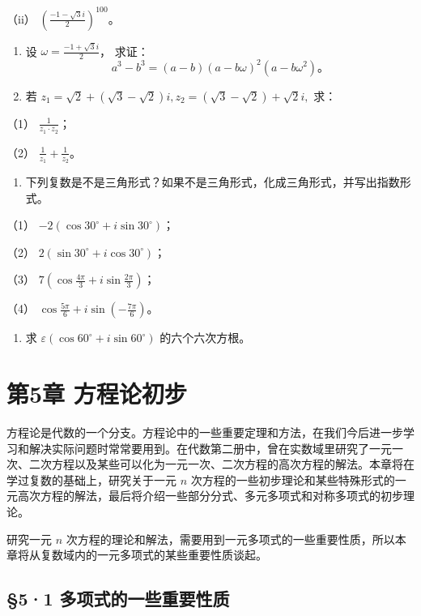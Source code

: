 （ii） \(\left(\frac{-1 - \sqrt{3}i}{2}\right)^{100}\)。

\begin{enumerate}[start=5]
\item
  设 \(\omega = \frac{-1 + \sqrt{3}i}{2}\)， 求证：
\[
a ^ {3} - b ^ {3} = (a - b) (a - b \omega) ^ {2} (a - b \omega^ {2})\text{。}
\]
\item
  若
  \(z_{1} = \sqrt{2} + (\sqrt{3} - \sqrt{2})i, z_{2} = (\sqrt{3} - \sqrt{2}) + \sqrt{2}i,\)
  求：
\end{enumerate}

（1） \(\frac{1}{z_1 \cdot z_2}\)；

（2） \(\frac{1}{z_1} + \frac{1}{z_2}\)。

\begin{enumerate}[start=7]
\item
  下列复数是不是三角形式？如果不是三角形式，化成三角形式，并写出指数形式。
\end{enumerate}

（1） \(-2(\cos 30^{\circ} + i\sin 30^{\circ})\)；

（2） \(2(\sin 30^{\circ} + i\cos 30^{\circ})\)；

（3） \(7\left(\cos \frac{4\pi}{3} + i\sin \frac{2\pi}{3}\right)\)；

（4） \(\cos \frac{5\pi}{6} + i\sin \left(-\frac{7\pi}{6}\right)\)。

\begin{enumerate}[start=8]
\item
  求 \(\varepsilon (\cos 60^{\circ} + i\sin 60^{\circ})\)
  的六个六次方根。
\end{enumerate}

\chapter{第5章 方程论初步}

方程论是代数的一个分支。方程论中的一些重要定理和方法，在我们今后进一步学习和解决实际问题时常常要用到。在代数第二册中，曾在实数域里研究了一元一次、二次方程以及某些可以化为一元一次、二次方程的高次方程的解法。本章将在学过复数的基础上，研究关于一元
\(n\)
次方程的一些初步理论和某些特殊形式的一元高次方程的解法，最后将介绍一些部分分式、多元多项式和对称多项式的初步理论。

研究一元 \(n\)
次方程的理论和解法，需要用到一元多项式的一些重要性质，所以本章将从复数域内的一元多项式的某些重要性质谈起。

\section{§5·1 多项式的一些重要性质}

